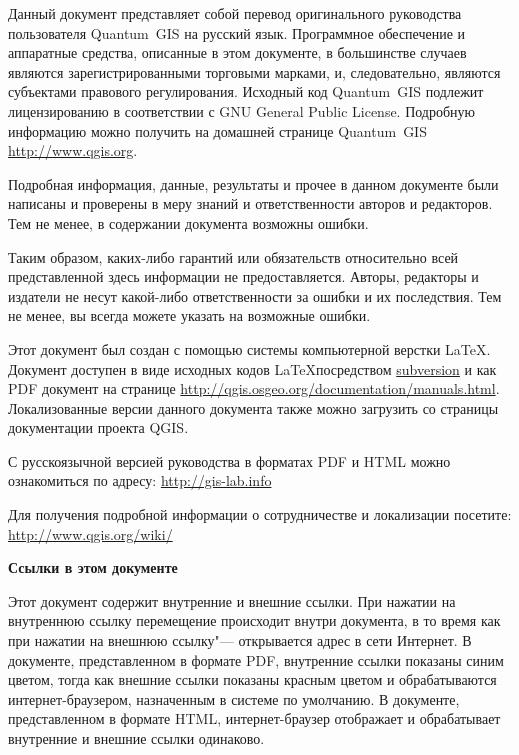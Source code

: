 \frontmatter
\pagestyle{scrplain}
\vspace{1cm}


Данный документ представляет собой перевод оригинального руководства
пользователя Quantum~GIS на русский язык. Программное обеспечение и
аппаратные средства, описанные в этом документе, в большинстве случаев
являются зарегистрированными торговыми марками, и, следовательно, являются
субъектами правового регулирования. Исходный код Quantum~GIS подлежит
лицензированию в соответствии с GNU General Public License. Подробную
информацию можно получить на домашней странице Quantum~GIS
\url{http://www.qgis.org}.
\par\bigskip
Подробная информация, данные, результаты и прочее в данном документе
были написаны и проверены в меру знаний и ответственности авторов и
редакторов. Тем не менее, в содержании документа возможны ошибки.
\par\bigskip
Таким образом, каких-либо гарантий или обязательств
относительно всей представленной здесь информации не предоставляется.
Авторы, редакторы и издатели не несут какой-либо ответственности за ошибки
и их последствия. Тем не менее, вы всегда можете указать на возможные ошибки.
\par\bigskip
Этот документ был создан с помощью системы компьютерной верстки \LaTeX.
Документ доступен в виде исходных кодов \LaTeX посредством
\href{http://wiki.qgis.org/qgiswiki/DocumentationWritersCorner}{subversion}
и как PDF документ на странице
\url{http://qgis.osgeo.org/documentation/manuals.html}.
Локализованные версии данного документа также можно загрузить со
страницы документации проекта QGIS.

С русскоязычной версией руководства в форматах PDF и HTML можно
ознакомиться по адресу: \url{http://gis-lab.info}


Для получения подробной информации о сотрудничестве и локализации
посетите: \url{http://www.qgis.org/wiki/}

\vspace{1cm}
\noindent
\textbf{Ссылки в этом документе}
\par\bigskip
Этот документ содержит внутренние и внешние ссылки. При нажатии на
внутреннюю ссылку перемещение происходит внутри документа, в то время
как при нажатии на внешнюю ссылку"--- открывается адрес в сети Интернет.
В документе, представленном в формате PDF, внутренние ссылки показаны
синим цветом, тогда как внешние ссылки показаны красным цветом и
обрабатываются интернет-браузером, назначенным в системе по умолчанию. В
документе, представленном в формате HTML, интернет-браузер отображает и
обрабатывает внутренние и внешние ссылки одинаково.

